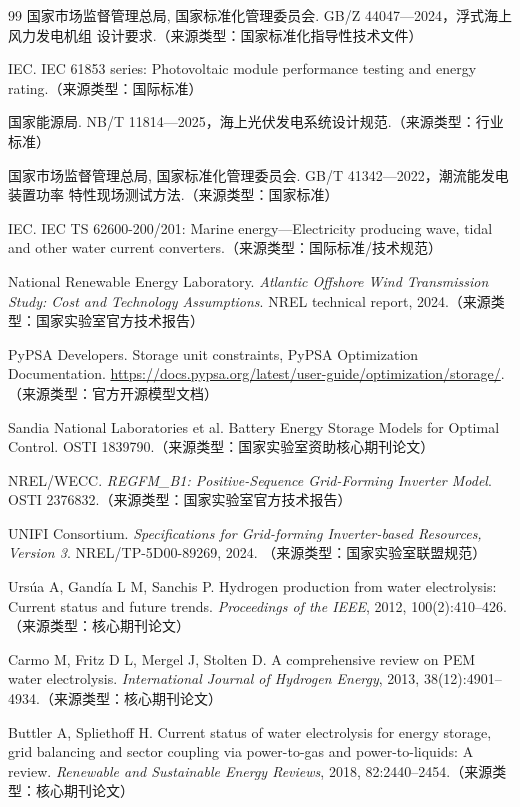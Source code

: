 \begin{thebibliography}{99}
国家市场监督管理总局, 国家标准化管理委员会. GB/Z 44047---2024，浮式海上风力发电机组
设计要求.（来源类型：国家标准化指导性技术文件）

IEC. IEC 61853 series: Photovoltaic module performance testing and energy
rating.（来源类型：国际标准）

国家能源局. NB/T 11814---2025，海上光伏发电系统设计规范.（来源类型：行业标准）

国家市场监督管理总局, 国家标准化管理委员会. GB/T 41342---2022，潮流能发电装置功率
特性现场测试方法.（来源类型：国家标准）

IEC. IEC TS 62600-200/201: Marine energy---Electricity producing wave, tidal
and other water current converters.（来源类型：国际标准/技术规范）

National Renewable Energy Laboratory. \emph{Atlantic Offshore Wind
Transmission Study: Cost and Technology Assumptions}. NREL technical report,
2024.（来源类型：国家实验室官方技术报告）

PyPSA Developers. Storage unit constraints, PyPSA Optimization Documentation.
\url{https://docs.pypsa.org/latest/user-guide/optimization/storage/}.
（来源类型：官方开源模型文档）

Sandia National Laboratories et al. Battery Energy Storage Models for Optimal
Control. OSTI 1839790.（来源类型：国家实验室资助核心期刊论文）

NREL/WECC. \emph{REGFM\_B1: Positive-Sequence Grid-Forming Inverter Model}.
OSTI 2376832.（来源类型：国家实验室官方技术报告）

UNIFI Consortium. \emph{Specifications for Grid-forming Inverter-based
Resources, Version 3}. NREL/TP-5D00-89269, 2024.
（来源类型：国家实验室联盟规范）

Ursúa A, Gandía L M, Sanchis P. Hydrogen production from water electrolysis:
Current status and future trends. \emph{Proceedings of the IEEE}, 2012,
100(2):410--426.（来源类型：核心期刊论文）

Carmo M, Fritz D L, Mergel J, Stolten D. A comprehensive review on PEM water
electrolysis. \emph{International Journal of Hydrogen Energy}, 2013,
38(12):4901--4934.（来源类型：核心期刊论文）

Buttler A, Spliethoff H. Current status of water electrolysis for energy
storage, grid balancing and sector coupling via power-to-gas and
power-to-liquids: A review. \emph{Renewable and Sustainable Energy Reviews},
2018, 82:2440--2454.（来源类型：核心期刊论文）


\end{thebibliography}
